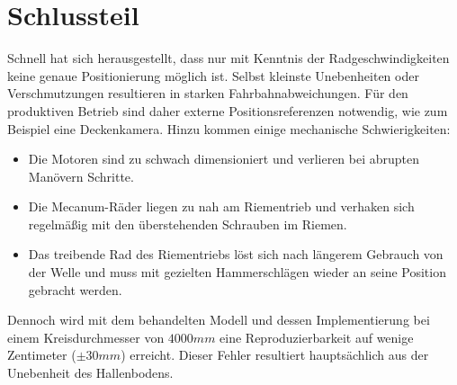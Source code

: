 \section{Schlussteil}
Schnell hat sich herausgestellt, dass nur mit Kenntnis der Radgeschwindigkeiten keine genaue Positionierung möglich ist. Selbst kleinste Unebenheiten oder Verschmutzungen resultieren in starken Fahrbahnabweichungen. Für den produktiven Betrieb sind daher externe Positionsreferenzen notwendig, wie zum Beispiel eine Deckenkamera. Hinzu kommen einige mechanische Schwierigkeiten:

\begin{itemize}
    \item Die Motoren sind zu schwach dimensioniert und verlieren bei abrupten Manövern Schritte.
    \item Die Mecanum-Räder liegen zu nah am Riementrieb und verhaken sich regelmäßig mit den überstehenden Schrauben im Riemen.
    \item Das treibende Rad des Riementriebs löst sich nach längerem Gebrauch von der Welle und muss mit gezielten Hammerschlägen wieder an seine Position gebracht werden.
\end{itemize}

Dennoch wird mit dem behandelten Modell und dessen Implementierung bei einem Kreisdurchmesser von $4000 mm$ eine Reproduzierbarkeit auf wenige Zentimeter ($\pm 30 mm$) erreicht.
Dieser Fehler resultiert hauptsächlich aus der Unebenheit des Hallenbodens.
